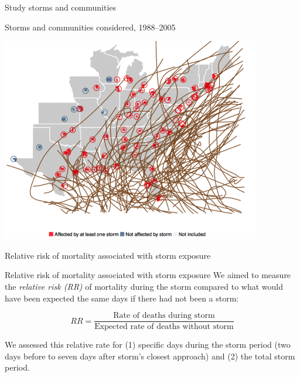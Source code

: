 \documentclass[ignorenonframetext,]{beamer}
\begin{document}
\begin{frame}{Study storms and communities}

\centering
\small{Storms and communities considered, 1988--2005}

\vspace{-0.2cm}

\begin{center}\includegraphics[width=0.85\textwidth]{mortality_storms_counties} \end{center}

\end{frame}

\begin{frame}{Relative risk of mortality associated with storm exposure}

\begin{block}{Relative risk of mortality associated with storm exposure}
We aimed to measure the \textit{relative risk (RR)} of mortality during the storm compared to what would have been expected the same days if there had not been a storm:

\begin{equation*}
RR = \frac{\text{Rate of deaths during storm}}{\text{Expected rate of deaths without storm}}
\end{equation*}

We assessed this relative rate for (1) specific days during the storm period (two days before to seven days after storm's closest approach) and (2) the total storm period. 

\end{block}

\end{frame}
\end{document}
